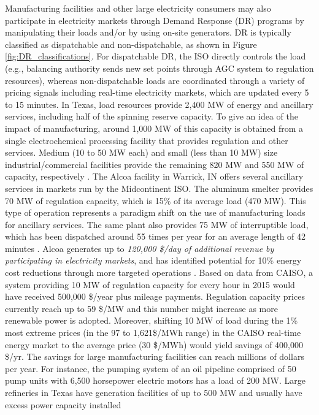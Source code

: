 \documentclass[11pt,twoside]{article}
\begin{document}
Manufacturing facilities and other large electricity consumers may also participate in electricity markets through Demand Response (DR) programs by manipulating their loads and/or by using on-site generators. DR is typically classified as dispatchable and non-dispatchable, as shown in Figure \ref{fig:DR_classifications}. For dispatchable DR, the ISO directly controls the load (e.g., balancing authority sends new set points through AGC system to regulation resources), whereas non-dispatchable loads are coordinated through a variety of pricing signals including real-time electricity markets, which are updated every 5 to 15 minutes. In Texas, load resources provide 2,400 MW of energy and ancillary services, including half of the spinning reserve capacity. To give an idea of the impact of manufacturing, around 1,000 MW of this capacity is obtained from a single electrochemical processing facility that provides regulation and other services. Medium (10 to 50 MW each) and small (less than 10 MW) size industrial/commercial facilities provide the remaining 820 MW and 550 MW of capacity, respectively \cite{Kirby2011}. The Alcoa facility in Warrick, IN offers several ancillary services in markets run by the Midcontinent ISO. The aluminum smelter provides 70 MW of regulation capacity, which is 15\% of its average load (470 MW). This type of operation represents a paradigm shift on the use of manufacturing loads for ancillary services. The same plant also provides 75 MW of interruptible load, which has been dispatched around 55 times per year for an average length of 42 minutes  \cite{Todd2009,Todd2013}. Alcoa generates up to {\em 120,000 \$/day of additional revenue by participating in electricity markets}, and has identified potential for 10\% energy cost reductions through more targeted operations \cite{Todd2013}. Based on data from CAISO, a system providing 10 MW of regulation capacity for every hour in 2015 would have received 500,000 \$/year plus mileage payments. Regulation capacity prices currently reach up to 59 \$/MW and this number might increase as more renewable power is adopted. Moreover, shifting 10 MW of load during the 1\% most extreme prices (in the 97 to 1,621\$/MWh range) in the CAISO real-time energy market to the average price (30 \$/MWh) would yield savings of 400,000 \$/yr. The savings for large manufacturing facilities can reach millions of dollars per year. For instance, the pumping system of an oil pipeline comprised of 50 pump units with 6,500 horsepower electric motors has a load of 200 MW. Large refineries in Texas have generation facilities of up to 500 MW and usually have excess power capacity installed 
\end{document}
